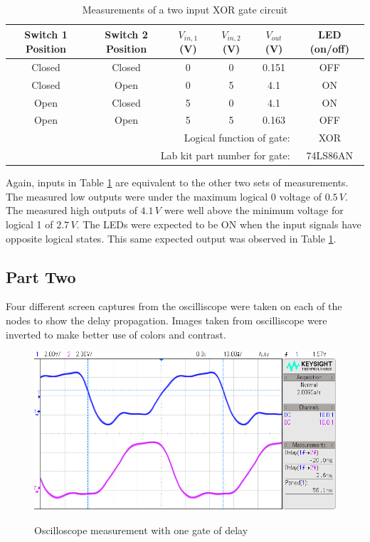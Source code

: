 \documentclass[CMPE]{KGCOEReport}
\begin{document}
\begin{table}[h]
\renewcommand{\arraystretch}{1.2}
\caption{Measurements of a two input XOR gate circuit}
\begin{center}
\begin{tabular}{|c|c|c|c|c|c|}
\hline
Switch 1 Position & Switch 2 Position & $V_{in,1}$ (V) & $V_{in,2}$ (V) & $V_{out}$ (V) & LED (on/off)\\\hline

Closed & Closed & 0 & 0 & 0.151 & OFF \\\hline
Closed & Open   & 0 & 5 & 4.1   & ON \\\hline
Open   & Closed & 5 & 0 & 4.1   & ON \\\hline
Open   & Open   & 5 & 5 & 0.163 & OFF \\\hline
\multicolumn{5}{|r|}{Logical function of gate: } & XOR  \\\hline
\multicolumn{5}{|r|}{Lab kit part number for gate: } & 74LS86AN  \\\hline

\end{tabular}
\end{center}
\label{tab:XOR}
\end{table}

Again, inputs in Table \ref{tab:XOR} are equivalent to the other two sets of measurements. The measured low outputs were under the maximum logical 0 voltage of $0.5\,V$. The measured high outputs of $4.1\,V$ were well above the minimum voltage for logical 1 of $2.7\,V$. The LEDs were expected to be ON when the input signals have opposite logical states. This same expected output was observed in Table \ref{tab:XOR}.


\subsection*{Part Two}

Four different screen captures from the oscilliscope were taken on each of the nodes to show the delay propagation. Images taken from oscilliscope were inverted to make better use of colors and contrast.


\begin{figure}[H]
\includegraphics[width=\textwidth]{fig1}
\label{fig:osc-1}
\caption{Oscilloscope measurement with one gate of delay} 
\end{figure}
\end{document}
